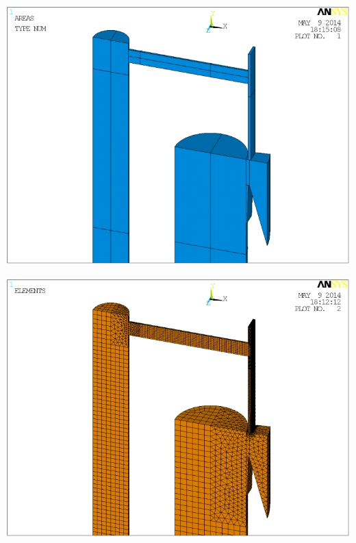 \documentclass[portrait,a0]{a0poster}
\begin{document}
\begin{multicols}{3}
	\begin{center}
		\vspace{-5pt}
		\begin{minipage}{.5\linewidth}
			\centering
			\includegraphics[width=0.95\linewidth]{vzduchovod1}
			\vspace{-5pt}
			\label{fig:vzduchovod_geom}
		\end{minipage}%
		\begin{minipage}{.5\linewidth}
			\centering
			\includegraphics[width=0.95\linewidth]{vzduchovod2}
			\vspace{-5pt}
			\label{fig:vzduchovod_mesh}
		\end{minipage}
		\vspace{-5pt}
	\end{center}
	

\end{multicols}
\end{document}
